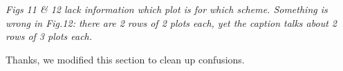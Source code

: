 \documentclass[10pt,a4paper]{article}
\begin{document}
\textit{Figs 11 \& 12 lack information which plot is for which scheme. Something is wrong in Fig.12: there are 2 rows of 2 plots each, yet the caption
talks about 2 rows of 3 plots each.}

Thanks, we modified this section to clean up confusions.
\\[3pt]


\end{document}
